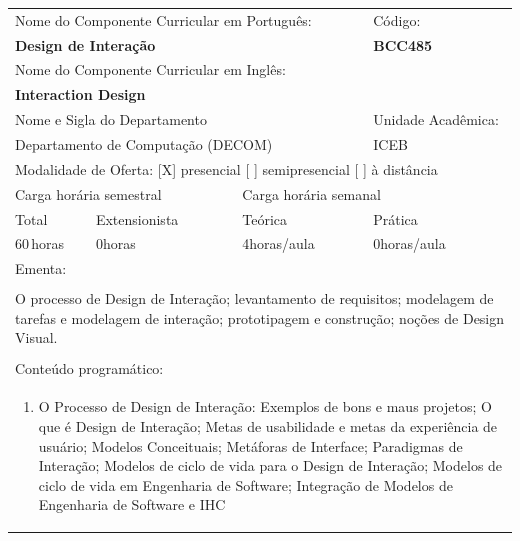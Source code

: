 \documentclass[11pt]{article}
\begin{document}
\begin{center}
\begin{longtable}{|p{4cm}|p{4cm}|p{4cm}|p{4cm}|}
\hline
\multicolumn{3}{|p{12cm}|}{Nome do Componente Curricular em Português:} &
\multicolumn{1}{p{4cm}|}{Código:} \\ 
\multicolumn{3}{|p{12cm}|}{\textbf{Design de Interação}} &
\textbf{BCC485}\\ 
\multicolumn{3}{|p{12cm}|}{Nome do Componente Curricular em Inglês:} & \\ 
\multicolumn{3}{|p{12cm}|}{\textbf{Interaction Design}} & \\ 
\hline
\multicolumn{3}{|p{12cm}|}{Nome e Sigla do Departamento} & Unidade Acadêmica: \\ 
\multicolumn{3}{|p{12cm}|}{Departamento de Computação (DECOM)} & {ICEB} \\ 
\hline
\multicolumn{4}{|p{16cm}|}{Modalidade de Oferta:
[X] presencial \hspace{0.6cm}
[ ] semipresencial \hspace{0.6cm}
[ ] à distância}\\
\hline
\multicolumn{2}{|p{8cm}|}{Carga horária semestral} &
\multicolumn{2}{p{8cm}|}{Carga horária semanal}\\
\hline
\multicolumn{1}{|p{4cm}|}{Total} &
\multicolumn{1}{p{4cm}|}{Extensionista} &
\multicolumn{1}{p{4cm}|}{Teórica} &
\multicolumn{1}{p{4cm}|}{Prática} \\ 
\multicolumn{1}{|p{4cm}|}{60\,horas} &
\multicolumn{1}{p{4cm}|}{0\;horas} &
\multicolumn{1}{p{4cm}|}{4\;horas/aula} &
\multicolumn{1}{p{4cm}|}{0\;horas/aula} \\ 
\hline
\multicolumn{4}{|p{16cm}|}{Ementa:}\\
\multicolumn{4}{|p{16cm}|}{}\\
\multicolumn{4}{|p{\dimexpr 16cm + 6\tabcolsep\relax}|}{O processo de Design de Interação; levantamento de requisitos; modelagem de tarefas e modelagem de interação; prototipagem e construção; noções de Design Visual.}\\
\multicolumn{4}{|p{16cm}|}{}\\
\hline
\multicolumn{4}{|p{16cm}|}{Conteúdo programático:}\\*
\multicolumn{4}{|p{\dimexpr 16cm + 6\tabcolsep\relax}|}{\begin{enumerate}[start=1]\item O Processo de Design de Interação: Exemplos de bons e maus projetos; O que é Design de Interação; Metas de usabilidade e metas da experiência de usuário; Modelos Conceituais; Metáforas de Interface; Paradigmas de Interação; Modelos de ciclo de vida para o Design de Interação; Modelos de ciclo de vida em Engenharia de Software; Integração de Modelos de Engenharia de Software e IHC\end{enumerate}}\\

\end{longtable}
\end{center}
\end{document}
